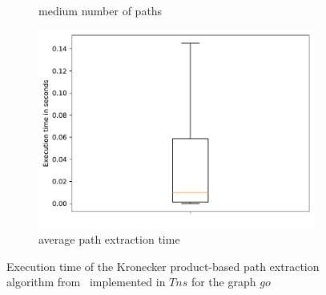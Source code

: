 \begin{figure}
\begin{subfigure}{0.32\textwidth}
		\caption{medium number of paths} \label{fig:extractTimeGoMedTns}
	\end{subfigure}
	\hspace*{\fill} %
	\begin{subfigure}{0.32\textwidth}
		\includegraphics[width=\linewidth,trim=0 0 -1.5cm 0]{pictures/go_10_all_tensor.pdf}
		\caption{average path extraction time} \label{fig:extractTimeGoAverageTns}
	\end{subfigure}
	\caption{Execution time of the Kronecker product-based path extraction algorithm from~\cite{kron} implemented in $Tns$ for the graph $go$}
	\label{fig:extractTimeTns}
\end{figure}

